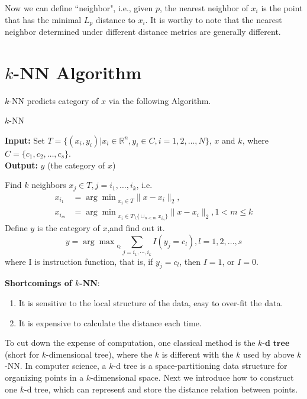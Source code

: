     Now we can define ``neighbor", i.e., given $p$, the nearest neighbor of $x_i$ is the point that has the minimal $L_p$ distance to $x_i$. It is worthy to note that the nearest neighbor determined under different distance metrics are generally different.

\section{$k$-NN Algorithm}

       $k$-NN predicts category of $x$ via the following Algorithm.

	\begin{algorithm}
    	\caption{$k$-NN}
    	\label{alo:K-NN}
    	\textbf{Input:}  Set $T=\{(x_i, y_i)|x_i\in\mathbb{R}^n, y_i\in C, i=1,2,\dots,N\}$, $x$ and $k$, where $C = \{c_{1}, c_{2}, \dots, c_{s}\}$. \\
    	\textbf{Output:} $y$ (the category of $x$)

    	\begin{algorithmic}[1]
         \State Find $k$ neighbors $x_j\in T, j=i_1,\dots,i_k$, i.e.
    	 \begin{align*}
    	 x_{i_1}&={\arg\min}_{x_i\in T} \|x-x_i\|_2,\\
    	 x_{i_m}&={\arg\min}_{x_i\in T\setminus \{\cup_{n<m}x_{i_n}\}} \|x-x_i\|_2, 1<m\leq k
    	 \end{align*}
    	 \State Define $y$ is the category of $x$,and find out it. $$y={\arg\max}_{c_l}\sum_{j=i_1,\cdots,i_k}I(y_j=c_l), l=1,2,\dots,s$$ where I is instruction function, that is, if $y_j=c_l$, then $I=1$, or $I=0$.
    	\end{algorithmic}
    \end{algorithm}

	\textbf{Shortcomings of $k$-NN}:
	  \begin{enumerate}
	  	\item It is sensitive to the local structure of the data, easy to over-fit the data.
	  	\item It is expensive to calculate the distance each time. 
	  \end{enumerate}
	  
	  To cut down the expense of computation, one classical method is the $\textbf{$k$-d tree}$(short for $k$-dimensional tree), where the $k$ is different with the $k$ used by above $k$-NN. In computer science, a $k$-d tree is a space-partitioning data structure for organizing points in a $k$-dimensional space. Next we introduce how to construct one $k$-d tree, which can represent and store the distance relation between points.
	  
